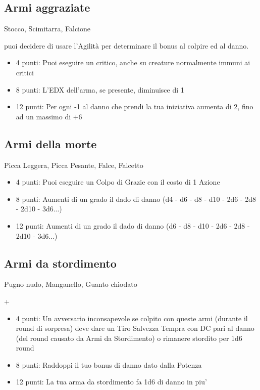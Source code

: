 \documentclass[a4paper,11pt,twoside,openany]{book}
\begin{document}
\subsection{Armi aggraziate} Stocco, Scimitarra, Falcione

puoi decidere di usare l'Agilità per determinare il bonus al colpire ed al danno.

\begin{itemize}
	\item 4 punti: Puoi eseguire un critico, anche su creature normalmente immuni
	      ai critici

	\item 8 punti: L'EDX dell'arma, se presente, diminuisce di 1

	\item 12 punti: Per ogni -1 al danno che prendi la tua iniziativa aumenta di 2, fino ad un massimo di +6
\end{itemize}

\subsection{Armi della morte} Picca Leggera, Picca Pesante, Falce, Falcetto

\begin{itemize}
	\item 4 punti: Puoi eseguire un Colpo di Grazie con il costo di 1 Azione

	\item 8 punti: Aumenti di un grado il dado di danno (d4 - d6 - d8 - d10 - 2d6 - 2d8 - 2d10 - 3d6...)

	\item 12 punti: Aumenti di un grado il dado di danno (d6 - d8 - d10 - 2d6 - 2d8 - 2d10 - 3d6...)

\end{itemize}

\subsection{Armi da stordimento} Pugno nudo, Manganello, Guanto chiodato

+\begin{itemize}
	\item 4 punti: Un avversario inconsapevole se colpito con queste armi (durante il round di sorpresa) deve dare un Tiro Salvezza Tempra con DC pari al danno (del round causato da Armi da Stordimento) o rimanere stordito per 1d6 round

	\item 8 punti: Raddoppi il tuo bonus di danno dato dalla Potenza

	\item 12 punti: La tua arma da stordimento fa 1d6 di danno in piu'
\end{itemize}
\end{document}
